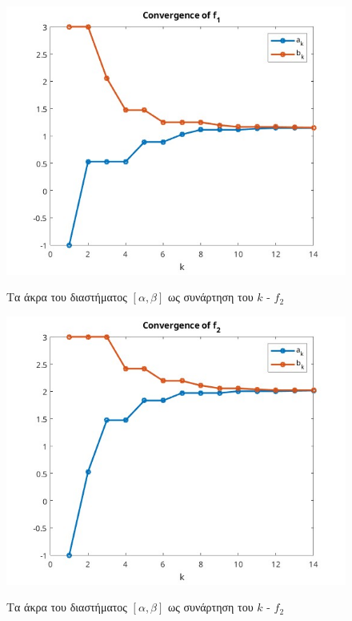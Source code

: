 \begin{figure}[H]
    \includegraphics[scale=0.7]{plots/ex2/f1.jpg}
    \label{fig:funcs}
    \caption{Τα άκρα του διαστήματος $[\alpha, \beta]$ ως συνάρτηση του $k$ - $f_2$}
    \centering
\end{figure}

\begin{figure}[H]
    \includegraphics[scale=0.7]{plots/ex2/f2.jpg}
    \label{fig:funcs}
    \caption{Τα άκρα του διαστήματος $[\alpha, \beta]$ ως συνάρτηση του $k$ - $f_2$}
    \centering
\end{figure}

